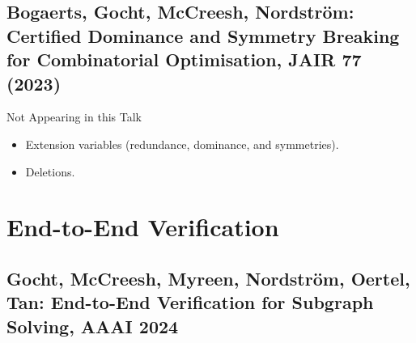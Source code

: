 \documentclass[aspectratio=169,compress,10pt]{beamer}
\begin{document}
\subsection{Bogaerts, Gocht, McCreesh, Nordstr\"om: Certified Dominance and Symmetry Breaking for
Combinatorial Optimisation, JAIR 77 (2023)}

\begin{frame}{Not Appearing in this Talk}
    \begin{itemize}
        \item Extension variables (redundance, dominance, and symmetries).
        \item Deletions.
    \end{itemize}
\end{frame}

\section{End-to-End Verification}

\subsection{Gocht, McCreesh, Myreen, Nordstr\"om, Oertel, Tan: End-to-End Verification for Subgraph Solving, AAAI 2024}
\end{document}
